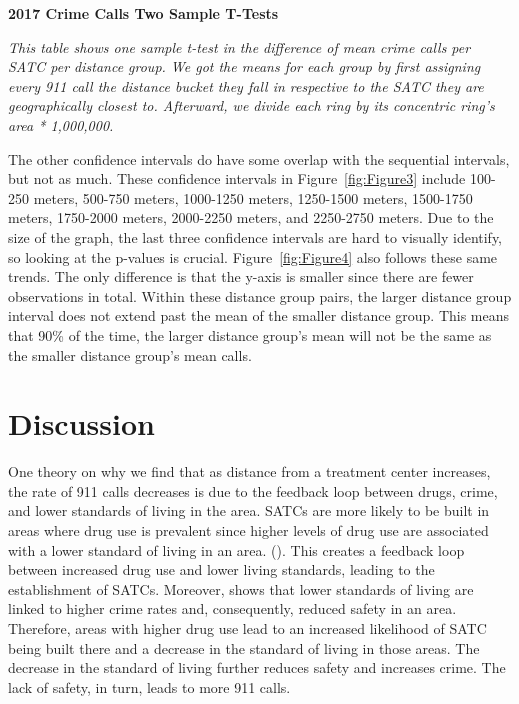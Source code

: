 \documentclass[12pt]{article}
\begin{document}
\begin{table}[h!]
\begin{center}

\end{center}


\caption{\bf{2017 Crime Calls Two Sample T-Tests}}
\label{tabl:Table2}
\textit{This table shows one sample t-test in the difference of mean crime calls per SATC per distance group. We got the means for each group by first assigning every 911 call the distance bucket they fall in respective to the SATC they are geographically closest to. Afterward, we divide each ring by its concentric ring's area * 1,000,000. }
\end{table}

The other confidence intervals do have some overlap with the sequential intervals, but not as much. These confidence intervals in Figure~\ref{fig:Figure3} include 100-250 meters, 500-750 meters, 1000-1250 meters, 1250-1500 meters, 1500-1750 meters, 1750-2000 meters, 2000-2250 meters, and 2250-2750 meters. Due to the size of the graph, the last three confidence intervals are hard to visually identify, so looking at the p-values is crucial. Figure~\ref{fig:Figure4} also follows these same trends. The only difference is that the y-axis is smaller since there are fewer observations in total. Within these distance group pairs, the larger distance group interval does not extend past the mean of the smaller distance group. This means that 90\% of the time, the larger distance group's mean will not be the same as the smaller distance group's mean calls. 

\break
\section{Discussion}
\label{sec:discussion}

One theory on why we find that as distance from a treatment center increases, the rate of 911 calls decreases is due to the feedback loop between drugs, crime, and lower standards of living in the area. SATCs are more likely to be built in areas where drug use is prevalent since higher levels of drug use are associated with a lower standard of living in an area. (\cite{drugs_and_crime}). This creates a feedback loop between increased drug use and lower living standards, leading to the establishment of SATCs. Moreover, \cite{drugs_and_crime} shows that lower standards of living are linked to higher crime rates and, consequently, reduced safety in an area. Therefore, areas with higher drug use lead to an increased likelihood of SATC being built there and a decrease in the standard of living in those areas. The decrease in the standard of living further reduces safety and increases crime. The lack of safety, in turn, leads to more 911 calls.  
\end{document}
